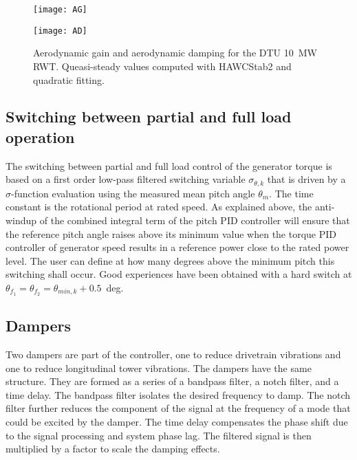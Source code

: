 \begin{figure}[!t]
\begin{center}
\parbox{0.45\columnwidth}{\mbox{\texttt{[image: AG]}}}\quad
\parbox{0.5\columnwidth}{\mbox{\texttt{[image: AD]}}}
\caption{Aerodynamic gain and aerodynamic damping for the DTU 10~MW RWT. Queasi-steady values computed with HAWCStab2 and quadratic fitting.}\label{f:gainsch}
\end{center}
\end{figure}

\subsection{Switching between partial and full load operation}

The switching between partial and full load control of the generator torque is based on a first order low-pass filtered switching variable $\sigma_{\theta,k}$ that is driven by a $\sigma$-function evaluation using the measured mean pitch angle $\theta_m$. The time constant is the rotational period at rated speed. As explained above, the anti-windup of the combined integral term of the pitch PID controller will ensure that the reference pitch angle raises above its minimum value when the torque PID controller of generator speed results in a reference power close to the rated power level. The user can define at how many degrees above the minimum pitch this switching shall occur. Good experiences have been obtained with a hard switch at $\theta_{f_1}=\theta_{f_2}=\theta_{min,k}+0.5$~deg.

\subsection{Dampers}
Two dampers are part of the controller, one to reduce drivetrain vibrations and one to reduce longitudinal tower vibrations.
The dampers have the same structure. They are formed as a series of a bandpass filter, a notch filter, and a time delay. 
The bandpass filter isolates the desired frequency to damp. The notch filter further reduces the component of the signal at the frequency of a mode that could be excited by the damper. The time delay compensates the phase shift due to the signal processing and system phase lag.
The filtered signal is then multiplied by a factor to scale the damping effects.

